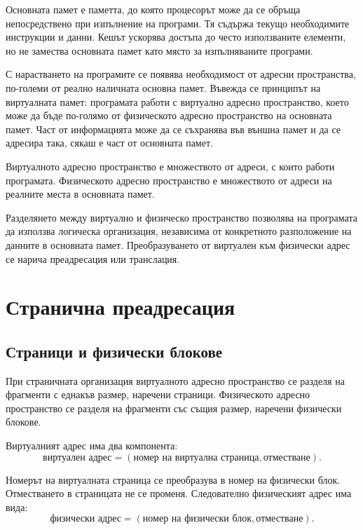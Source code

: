 Основната памет е паметта, до която процесорът може да се обръща непосредствено при изпълнение на програми. Тя съдържа текущо необходимите инструкции и данни. Кешът ускорява достъпа до често използваните елементи, но не замества основната памет като място за изпълняваните програми.

С нарастването на програмите се появява необходимост от адресни пространства, по-големи от реално наличната основна памет. Въвежда се принципът на виртуалната памет: програмата работи с виртуално адресно пространство, което може да бъде по-голямо от физическото адресно пространство на основната памет. Част от информацията може да се съхранява във външна памет и да се адресира така, сякаш е част от основната памет.

\begin{defn}
Виртуалното адресно пространство е множеството от адреси, с които работи програмата. Физическото адресно пространство е множеството от адреси на реалните места в основната памет.
\end{defn}

\begin{defn}
Разделянето между виртуално и физическо пространство позволява на програмата да използва логическа организация, независима от конкретното разположение на данните в основната памет. Преобразуването от виртуален към физически адрес се нарича преадресация или транслация.
\end{defn}

\section{Странична преадресация}\label{s:10.2}

\subsection{Страници и физически блокове}\label{s:10.2.1}

При страничната организация виртуалното адресно пространство се разделя на фрагменти с еднакъв размер, наречени страници. Физическото адресно пространство се разделя на фрагменти със същия размер, наречени физически блокове.

Виртуалният адрес има два компонента:
\[
\text{виртуален адрес}=(\text{номер на виртуална страница},\text{отместване}).
\]

Номерът на виртуалната страница се преобразува в номер на физически блок. Отместването в страницата не се променя. Следователно физическият адрес има вида:
\[
\text{физически адрес}=(\text{номер на физически блок},\text{отместване}).
\]


